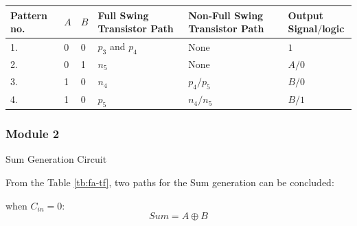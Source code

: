 \documentclass[conference]{IEEEtran}
\begin{document}
\begin{table}[!htb]
\begin{tabular}{p{1.5cm}p{1.5cm}p{1.5cm}p{4cm}p{4cm}l}
		Pattern no.                           & \(A\)                                                  & \(B\)                                  & Full Swing Transistor Path & Non-Full Swing Transistor Path & Output Signal\(/\)logic \\
		\hline
		1.                                    & 0                                                      & 0                                      & \(p_3\) and \(p_4\)        & None                           & \(1\)                   \\
		2.                                    & 0                                                      & 1                                      & \(n_5\)                    & None                           & \(A/0\)                 \\
		3.                                    & 1                                                      & 0                                      & \(n_4\)                    & \(p_4/p_5\)                    & \(B/0\)                 \\
		4.                                    & 1                                                      & 0                                      & \(p_5\)                    & \(n_4/n_5\)                    & \(B/1\)                 \\
		\hline
	\end{tabular}
	\label{tb:xor-xnor}
\end{table}

\subsubsection{Module 2}Sum Generation Circuit

From the Table \ref{tb:fa-tf}, two paths for the Sum generation can be concluded:

when \(C_{in} = 0\):
\[
	Sum = A \oplus B
\]
\end{document}
